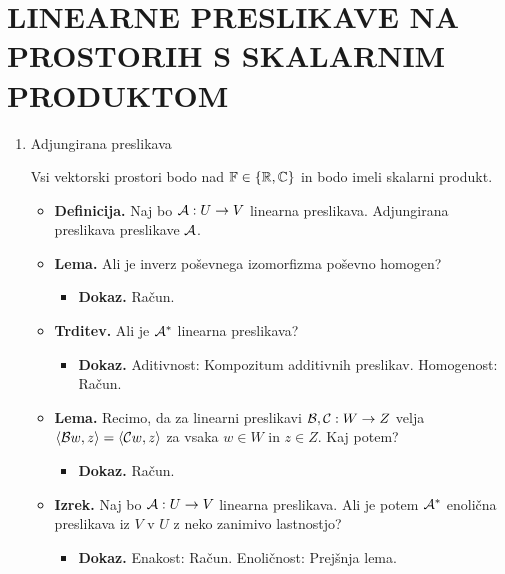 \section{LINEARNE PRESLIKAVE NA PROSTORIH S SKALARNIM PRODUKTOM}

\begin{enumerate}
    \item Adjungirana preslikava
    
    Vsi vektorski prostori bodo nad $\mathbb{F} \in \left\{\mathbb{R}, \mathbb{C}\right\}$ in bodo imeli skalarni produkt.
    \begin{itemize}
        \item \colorbox{purple!30}{\textbf{Definicija.}} Naj bo $\mathcal{A}: U \to V$ linearna preslikava. Adjungirana preslikava preslikave $\mathcal{A}$.
        \item \colorbox{blue!30}{\textbf{Lema.}} Ali je inverz poševnega izomorfizma poševno homogen?
        \begin{itemize}
            \item \colorbox{green!30}{\textbf{Dokaz.}} Račun.            
        \end{itemize}
        \item \colorbox{blue!30}{\textbf{Trditev.}} Ali je $\mathcal{A}^*$ linearna preslikava?
        \begin{itemize}
            \item \colorbox{green!30}{\textbf{Dokaz.}} Aditivnost: Kompozitum additivnih preslikav.            
            Homogenost: Račun.
        \end{itemize}
        \item \colorbox{blue!30}{\textbf{Lema.}} Recimo, da za linearni preslikavi $\mathcal{B}, \mathcal{C}: W \to Z$ velja $\left\langle \mathcal{B} w, z\right\rangle = \left\langle \mathcal{C}w, z \right\rangle$ za vsaka $w \in W$ in $z \in Z$. Kaj potem?
        \begin{itemize}
            \item \colorbox{green!30}{\textbf{Dokaz.}} Račun.            
        \end{itemize}
        \item \colorbox{blue!30}{\textbf{Izrek.}} Naj bo $\mathcal{A}: U \to V$ linearna preslikava. Ali je potem $\mathcal{A}^*$ enolična preslikava iz $V$ v $U$ z neko zanimivo lastnostjo?
        \begin{itemize}
            \item \colorbox{green!30}{\textbf{Dokaz.}} Enakost: Račun. Enoličnost: Prejšnja lema.           
        \end{itemize}

\end{itemize}
\end{enumerate}
